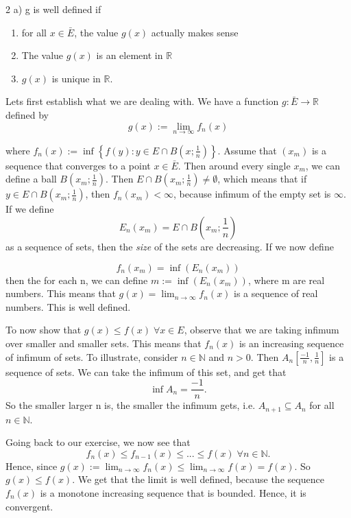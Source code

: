 \documentclass[a4paper,norsk]{article}
\renewcommand{\leq}{\leqslant}
\begin{document}
\begin{proofbox}{2 a)}{}
    g is well defined if
    \begin{enumerate}
        \item for all $ x \in \bar{E} $, the value $ g(x) $ actually makes sense
        \item The value $ g(x) $ is an element in $ \mathbb{R} $ 
        \item $ g(x) $ is unique in $ \mathbb{R} $.
    \end{enumerate}


    Lets first establish what we are dealing with. We have a function $ g : \bar{E} \to \mathbb{R} $ defined by 
    \[
        g(x) := \lim_{n \to \infty} f_n(x)  
    \]

    where $ f_n(x) := \inf \left\{ f(y) : y \in E \cap B \left( x ; \frac{ 1 }{ n } \right)  \right\}  $. Assume that $ \left( x_m \right)  $ is a sequence that converges to a point $ x \in \bar{E} $. Then around every single $ x_m $, we can define a ball $ B \left( x_m ; \frac{ 1 }{ n } \right)  $. Then $ E \cap B \left( x_m ; \frac{ 1 }{ n } \right) \neq \emptyset  $, which means that if $ y \in E \cap B \left( x_m ; \frac{ 1 }{ n } \right) $, then $ f_n(x_m) < \infty $, because infimum of the empty set is $ \infty $. If we define
    \[
        E_n(x_m) = E \cap B \left( x_m; \frac{ 1 }{ n } \right) 
    \]
    as a sequence of sets, then the \textit{size} of the sets are decreasing. If we now define 

    \[
        f_n(x_m) =  \inf(E_n(x_m))
    \]
    then the for each n, we can define $ m := \inf(E_n(x_m)) $, where m are real numbers. This means that $ g(x) = \lim_{n \to \infty}  f_n(x) $ is a sequence of real numbers. This is well defined.
    
    

    To now show that $ g(x) \leq f(x) \; \forall x \in E $, observe that we are taking infimum over smaller and smaller sets. This means that $ f_n(x)  $ is an increasing sequence of infimum of sets. To illustrate, consider $ n \in \mathbb{N} $ and $ n > 0 $. Then $ A_n \left[ \frac{ -1 }{ n }, \frac{ 1 }{ n } \right]  $ is a sequence of sets. We can take the infimum of this set, and get that 
    \[
        \inf A_n = \frac{ -1 }{ n }.
    \]
    So the smaller larger n is, the smaller the infimum gets, i.e. $ A_{n+1} \subseteq A_n$ for all $ n \in \mathbb{N} $. 

    
    Going back to our exercise, we now see that 
    \[
        f_{n}(x) \leq  f_{n-1}(x) \leq ... \leq f(x) \; \forall n \in \mathbb{N}.
    \]
    Hence, since $ g(x) := \lim_{n \to \infty} f_n(x) \leq \lim_{n \to \infty} f(x) = f(x)   $. So $ g(x) \leq  f(x) $. We get that the limit is well defined, because the sequence $ f_n(x) $ is a monotone increasing sequence that is bounded. Hence, it is convergent.
\end{proofbox}
\end{document}
